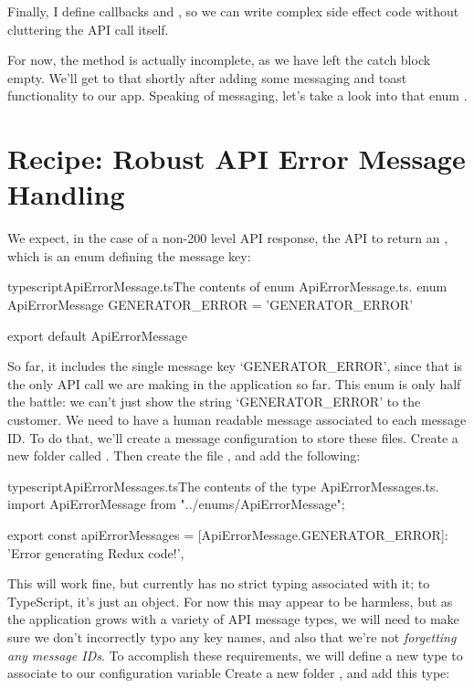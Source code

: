 \documentclass[paper=6in:9in,pagesize=pdftex,headinclude=on,footinclude=on,12pt,twoside]{scrbook}
\begin{document}
Finally, I define callbacks  and , so we can write complex side effect code without cluttering the API call itself. 

For now, the  method is actually incomplete, as we have left the catch block empty. We'll get to that shortly after adding some messaging and toast functionality to our app. Speaking of messaging, let's take a look into that enum .

\section{Recipe: Robust API Error Message Handling}

We expect, in the case of a non-200 level API response, the API to return an , which is an enum defining the message key:

\begin{codeInput}{typescript}{ApiErrorMessage.ts}{The contents of enum ApiErrorMessage.ts.}
enum ApiErrorMessage {
    GENERATOR_ERROR = 'GENERATOR_ERROR'
}

export default ApiErrorMessage
\end{codeInput}

So far, it includes the single message key `GENERATOR\_ERROR', since that is the only API call we are making in the application so far. This enum is only half the battle: we can't just show the string `GENERATOR\_ERROR' to the customer. We need to have a human readable message associated to each message ID. To do that, we'll create a message configuration to store these files. Create a new folder called . Then create the file , and add the following:

\begin{codeInput}{typescript}{ApiErrorMessages.ts}{The contents of the type ApiErrorMessages.ts.}
import ApiErrorMessage from "../enums/ApiErrorMessage";

export const apiErrorMessages = {
    [ApiErrorMessage.GENERATOR_ERROR]: 'Error generating Redux code!',
}
\end{codeInput}

This will work fine, but  currently has no strict typing associated with it; to TypeScript, it's just an object. For now this may appear to be harmless, but as the application grows with a variety of API message types, we will need to make sure we don't incorrectly typo any key names, and also that we're not \textit{forgetting any message IDs}. To accomplish these requirements, we will define a new type to associate to our configuration variable  Create a new folder , and add this type:
\end{document}
